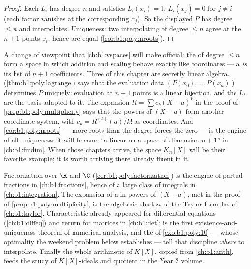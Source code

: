 \begin{proof}
Each $L_i$ has degree $n$ and satisfies $L_i(x_i) = 1$, $L_i(x_j) =
0$ for $j \neq i$ (each factor vanishes at the corresponding $x_j$).
So the displayed $P$ has degree $\leq n$ and interpolates. Uniqueness:
two interpolating  of degree $\leq n$ agree at the $n+1$
points $x_i$, hence are equal (\cref{cor:b1:poly:nroots}).
\end{proof}

\begin{remark}\label{rem:b1:poly:interlude}
A change of viewpoint that \cref{ch:b1:vspaces} will make
official: the  of degree $\leq n$ form a space in
which addition and scaling behave exactly like coordinates ---
a  \emph{is} its list of $n + 1$ coefficients. Three
 of this chapter are secretly linear algebra.
 (\cref{thm:b1:poly:lagrange}) says that
the evaluation data $(P(x_0), \dots, P(x_n))$ determines $P$
uniquely: evaluation at $n + 1$ points is a linear bijection,
and the $L_i$ are the basis adapted to it. The expansion $R =
\sum c_k(X - a)^k$ in the proof of
\cref{prop:b1:poly:multiplicity} says that the powers of
$(X - a)$ form another coordinate system, with $c_k =
R^{(k)}(a)/k!$ as coordinates. And
\cref{cor:b1:poly:nroots} --- more roots than the degree forces
the zero  --- is the engine of all uniqueness: it will
become ``a linear   on a space of dimension $n + 1$''
in \cref{ch:b1:findim}. When those chapters arrive, the space
$K_n[X]$ will be their favorite example; it is worth arriving
there already fluent in it.
\end{remark}

\begin{remark}\label{rem:b1:poly:whereused}
Factorization over $\R$ and $\C$
(\cref{cor:b1:poly:factorization}) is the engine of partial
fractions in \cref{ch:b1:fractions}, hence of a large class of
integrals in \cref{ch:b1:integration}. The expansion of a
 in powers of $(X - a)$, met in the proof of
\cref{prop:b1:poly:multiplicity}, is the algebraic shadow of the
Taylor formulas of \cref{ch:b1:taylor}. Characteristic 
already appeared for differential equations (\cref{ch:b1:diffeq})
and return for matrices in \cref{ch:b1:det};  is the first existence-and-uniqueness theorem of
numerical analysis, and the  of
\cref{exo:b1:poly:10} --- whose optimality the weekend problem
below establishes --- tell that discipline \emph{where} to
interpolate. Finally the whole arithmetic of $K[X]$, copied from
\cref{ch:b1:arith}, feeds the study of $K[X]$-ideals and quotient
 in the Year 2 volume.
\end{remark}

